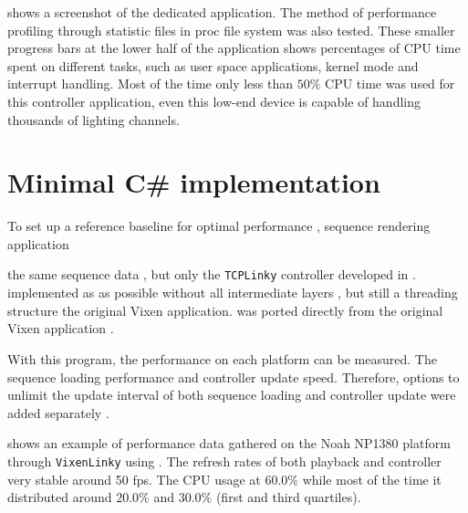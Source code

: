  shows a screenshot of the dedicated application. The method of performance profiling through statistic files in proc file system was also tested. These smaller progress bars at the lower half of the application shows percentages of CPU time spent on different tasks, such as user space applications, kernel mode and interrupt handling. Most of the time only less than $50 \%$ CPU time was used for this controller application,  even this low-end device is capable of handling thousands of lighting channels.

\section{Minimal C\# implementation}

To set up a reference baseline for optimal performance , sequence rendering application 


 the same  sequence data , but  only the \texttt{TCPLinky} controller developed in .  implemented as  as possible without all intermediate layers , but still  a threading structure  the original Vixen application.  was ported directly from the original Vixen application .


With this program, the  performance  on each platform can be measured. The  sequence loading performance and controller update speed. Therefore, options to unlimit the update interval of both sequence loading and controller update were added separately .

 shows an example of performance data gathered on the Noah NP1380 platform through \texttt{VixenLinky} using . The refresh rates of both playback and controller  very stable around  50 fps. The CPU usage  at $60.0 \%$\ca{,} while most of the time it  distributed around $20.0 \%$ and $30.0 \%$ (first and third quartiles).

